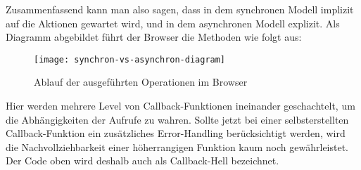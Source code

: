 \noindent
Zusammenfassend kann man also sagen, dass in dem synchronen Modell implizit auf die Aktionen gewartet wird, und in dem asynchronen Modell explizit. Als Diagramm abgebildet führt der Browser die Methoden wie folgt aus:

\begin{center}
\begin{figure}[H]
\texttt{[image: synchron-vs-asynchron-diagram]}
\caption{Ablauf der ausgeführten Operationen im Browser}
\end{figure}
\end{center}

\noindent
Hier werden mehrere Level von Callback-Funktionen ineinander geschachtelt, um die Abhängigkeiten der Aufrufe zu wahren. Sollte jetzt bei einer selbsterstellten Callback-Funktion ein zusätzliches Error-Handling berücksichtigt werden, wird die Nachvollziehbarkeit einer höherrangigen Funktion kaum noch gewährleistet. Der Code oben wird deshalb auch als Callback-Hell bezeichnet.




